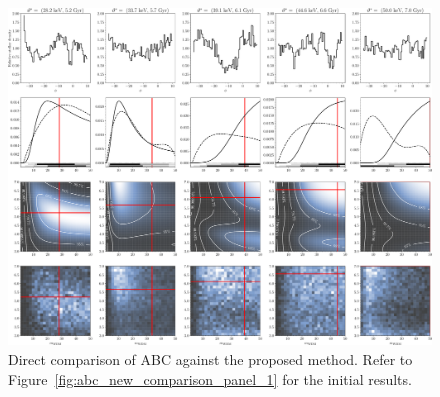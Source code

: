 \documentclass[fleqn,usenatbib]{mnras}
\begin{document}
\begin{figure}
    \vspace{4.5cm} %
    \centering
    \includegraphics[trim=0 0 350 0, clip, angle=90,width=.85\linewidth]{figures/abc-new-comparison-panel-2.pdf}
    \caption{
    Direct comparison of ABC against the proposed method. Refer to Figure~\ref{fig:abc_new_comparison_panel_1} for the initial results.
    ~~\protect{} 
    }
    \label{fig:abc_new_comparison_panel_2}
\end{figure}


\clearpage
\bsp	%
\label{lastpage}
\end{document}
